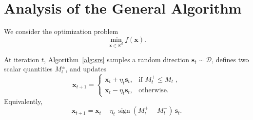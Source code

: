 \documentclass[twoside]{article}
\theoremstyle{plain}
\theoremstyle{definition}
\theoremstyle{remark}
\def\cD{{\mathcal{D}}}
\def\vs{{\bm{s}}}
\def\vx{{\bm{x}}}
\newcommand{\R}{\mathbb{R}}
\begin{document}
\section{Analysis of the General Algorithm}

We consider the optimization problem
\[
    \min_{\vx\in\R^d} f(\vx).
\]

At iteration $t$, Algorithm~\ref{alg:srs} samples a random direction
$\vs_t \sim \cD$, defines two scalar quantities $M_t^\pm$, and updates
\[
    \vx_{t+1}
    =
    \begin{cases}
        \vx_t + \eta_t \vs_t, & \text{if } M_t^+ \le M_t^-, \\[4pt]
        \vx_t - \eta_t \vs_t, & \text{otherwise}.
    \end{cases}
\]
Equivalently,
\[
    \vx_{t+1}
    = \vx_t - \eta_t\,\operatorname{sign}(M_t^+ - M_t^-)\,\vs_t.
\]
\end{document}
